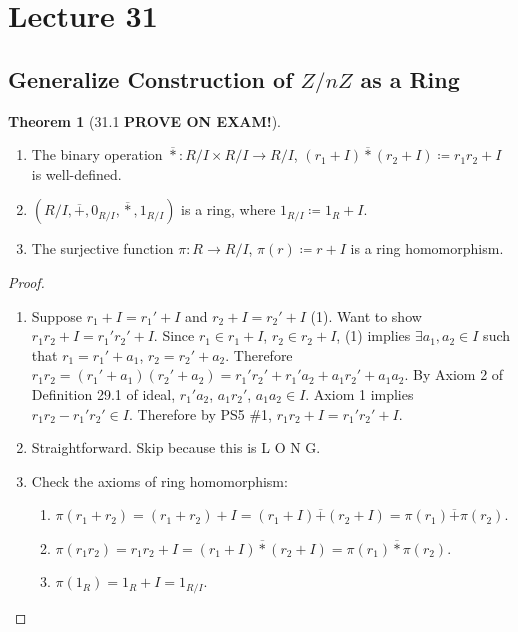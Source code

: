 \documentclass{article}
\newcommand{\coleq}{\coloneqq}
\newcommand{\func}[3]{#1: #2 \to #3}
\theoremstyle{definition}
\newtheorem*{thm}{Theorem}
\theoremstyle{remark}
\begin{document}
    \section*{Lecture 31}{
        \subsection*{Generalize Construction of $Z/nZ$ as a Ring}{
            \begin{thm}[31.1 \textbf{PROVE ON EXAM!}]\hfill
                \begin{enumerate}
                    \item The binary operation $\func{\overline{*}}{R/I\times R/I}{R/I}$, $(r_1+I)\overline{*}(r_2+I)\coleq r_1r_2+I$ is well-defined.
                    \item $(R/I,\overline{+},0_{R/I},\overline{*},1_{R/I})$ is a ring, where $1_{R/I}\coleq 1_R+I$.
                    \item The surjective function $\func{\pi}{R}{R/I}$, $\pi(r)\coleq r+I$ is a ring homomorphism.
                \end{enumerate}
            \end{thm}
            
            \begin{proof}
                \begin{enumerate}
                    \item Suppose $r_1+I=r_1'+I$ and $r_2+I=r_2'+I$ (1). Want to show $r_1r_2+I=r_1'r_2'+I$. Since $r_1 \in r_1 + I$, $r_2 \in r_2+I$, (1) implies $\exists a_1,a_2 \in I$ such that $r_1=r_1'+a_1$, $r_2=r_2'+a_2$. Therefore $r_1r_2=(r_1'+a_1)(r_2'+a_2)=r_1'r_2'+r_1'a_2+a_1r_2'+a_1a_2$. By Axiom 2 of Definition 29.1 of ideal, $r_1'a_2$, $a_1r_2'$, $a_1a_2 \in I$. Axiom 1 implies $r_1r_2-r_1'r_2' \in I$. Therefore by PS5 \#1, $r_1r_2+I=r_1'r_2'+I$.
                    \item Straightforward. Skip because this is L O N G.
                    \item Check the axioms of ring homomorphism:
                    \begin{enumerate}
                        \item $\pi(r_1+r_2)=(r_1+r_2)+I=(r_1+I)\overline{+}(r_2+I)=\pi(r_1)\overline{+}\pi(r_2)$.
                        \item $\pi(r_1r_2)=r_1r_2+I=(r_1+I)\overline{*}(r_2+I)=\pi(r_1)\overline{*}\pi(r_2)$.
                        \item $\pi(1_R)=1_R+I=1_{R/I}$.
                    \end{enumerate}
                \end{enumerate}
            \end{proof}
            
}}
\end{document}
